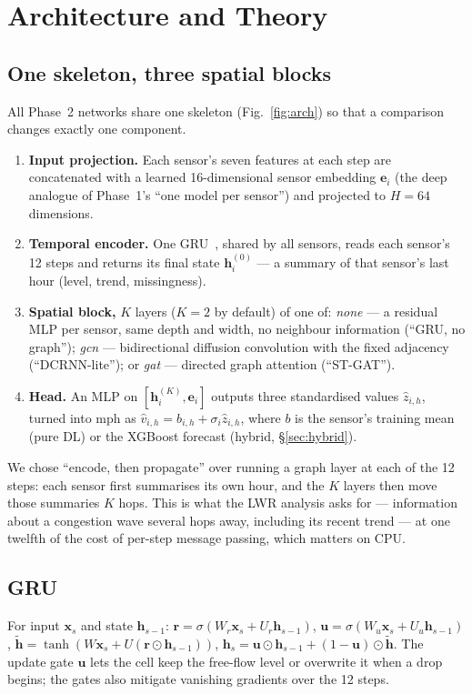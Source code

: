 \section{Architecture and Theory}\label{sec:arch}
\subsection{One skeleton, three spatial blocks}
All Phase~2 networks share one skeleton (Fig.~\ref{fig:arch}) so that a comparison changes exactly one component.
\begin{enumerate}
\item \textbf{Input projection.} Each sensor's seven features at each step are concatenated with a learned 16-dimensional sensor embedding $\mathbf{e}_i$ (the deep analogue of Phase~1's ``one model per sensor'') and projected to $H=64$ dimensions.
\item \textbf{Temporal encoder.} One GRU~\cite{cho2014gru}, shared by all sensors, reads each sensor's 12 steps and returns its final state $\mathbf{h}_i^{(0)}$ --- a summary of that sensor's last hour (level, trend, missingness).
\item \textbf{Spatial block,} $K$ layers ($K=2$ by default) of one of:
  \emph{none} --- a residual MLP per sensor, same depth and width, no neighbour information (``GRU, no graph'');
  \emph{gcn} --- bidirectional diffusion convolution with the fixed adjacency (``DCRNN-lite''); or
  \emph{gat} --- directed graph attention (``ST-GAT'').
\item \textbf{Head.} An MLP on $[\mathbf{h}_i^{(K)},\mathbf{e}_i]$ outputs three standardised values $\hat z_{i,h}$, turned into mph as $\hat v_{i,h}=b_{i,h}+\sigma_i\hat z_{i,h}$, where $b$ is the sensor's training mean (pure DL) or the XGBoost forecast (hybrid, \S\ref{sec:hybrid}).
\end{enumerate}
We chose ``encode, then propagate'' over running a graph layer at each of the 12 steps: each sensor first summarises its own hour, and the $K$ layers then move those summaries $K$ hops. This is what the LWR analysis asks for --- information about a congestion wave several hops away, including its recent trend --- at one twelfth of the cost of per-step message passing, which matters on CPU.

\subsection{GRU}
For input $\mathbf{x}_s$ and state $\mathbf{h}_{s-1}$: $\mathbf{r}=\sigma(W_r\mathbf{x}_s+U_r\mathbf{h}_{s-1})$, $\mathbf{u}=\sigma(W_u\mathbf{x}_s+U_u\mathbf{h}_{s-1})$, $\tilde{\mathbf{h}}=\tanh(W\mathbf{x}_s+U(\mathbf{r}\odot\mathbf{h}_{s-1}))$, $\mathbf{h}_s=\mathbf{u}\odot\mathbf{h}_{s-1}+(1-\mathbf{u})\odot\tilde{\mathbf{h}}$. The update gate $\mathbf{u}$ lets the cell keep the free-flow level or overwrite it when a drop begins; the gates also mitigate vanishing gradients over the 12 steps.

